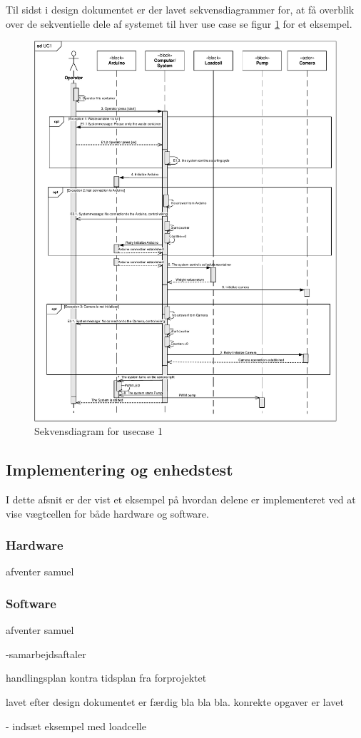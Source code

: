 Til sidst i design dokumentet er der lavet sekvensdiagrammer for, at få overblik over de sekventielle dele af systemet til hver use case se figur \ref{fig:sekvendisgr} for et eksempel.
\begin{figure}[H]
	\centering
	\includegraphics[width=1\textwidth]{pdf/UC1_cropped.pdf}
	\caption{Sekvensdiagram for usecase 1}
	\label{fig:sekvendisgr}
\end{figure}


\subsection{Implementering og enhedstest}
I dette afsnit er der vist et eksempel på hvordan delene er implementeret ved at vise vægtcellen for både hardware og software.

\subsubsection{Hardware}
afventer samuel
\subsubsection{Software}
afventer samuel


-samarbejdsaftaler

handlingsplan kontra tidsplan fra forprojektet

lavet efter design dokumentet er færdig bla bla bla. konrekte opgaver er lavet

- indsæt eksempel med loadcelle
